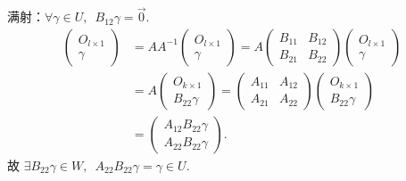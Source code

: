 \documentclass[12pt,fontset=fandol]{ctexart}
\begin{document}
\begin{solve}
            满射：$ \forall \gamma \in U,\enspace B_{12} \gamma = \vec{0} $.
            \begin{align*}
                \begin{pmatrix} O_{l \times 1} \\ \gamma \end{pmatrix}
                & = A A^{-1} \begin{pmatrix} O_{l \times 1} \\ \gamma \end{pmatrix} = A \begin{pmatrix} B_{11} & B_{12} \\ B_{21} & B_{22} \end{pmatrix} \begin{pmatrix} O_{l \times 1} \\ \gamma \end{pmatrix}      \\
                & = A \begin{pmatrix} O_{k \times 1} \\ B_{22} \gamma \end{pmatrix} = \begin{pmatrix} A_{11} & A_{12} \\ A_{21} & A_{22} \end{pmatrix} \begin{pmatrix} O_{k \times 1} \\ B_{22} \gamma \end{pmatrix} \\
                & = \begin{pmatrix} A_{12} B_{22} \gamma \\ A_{22} B_{22} \gamma \end{pmatrix}.
            \end{align*}
            故 $ \exists B_{22} \gamma \in W,\enspace A_{22} B_{22} \gamma = \gamma \in U $.
\end{solve}
\end{document}

